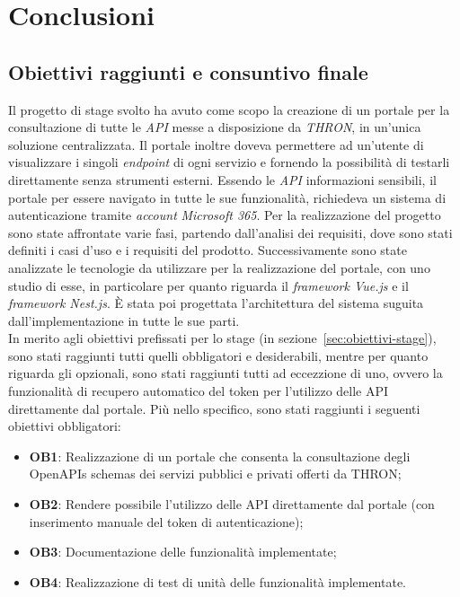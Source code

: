 \chapter{Conclusioni}\label{cap:conclusioni}


\section{Obiettivi raggiunti e consuntivo finale}
Il progetto di stage svolto ha avuto come scopo la creazione di un portale per la consultazione di tutte le \textit{API} messe a disposizione da \textit{THRON}, in un'unica soluzione centralizzata. 
Il portale inoltre doveva permettere ad un'utente di visualizzare i singoli \textit{endpoint} di ogni servizio e fornendo la possibilità di testarli direttamente senza strumenti esterni.
Essendo le \textit{API} informazioni sensibili, il portale per essere navigato in tutte le sue funzionalità, richiedeva un sistema di autenticazione tramite \textit{account} \textit{Microsoft 365}.
Per la realizzazione del progetto sono state affrontate varie fasi, partendo dall'analisi dei requisiti, dove sono stati definiti i casi d'uso e i requisiti del prodotto.
Successivamente sono state analizzate le tecnologie da utilizzare per la realizzazione del portale, con uno studio di esse, in particolare per quanto riguarda il \textit{framework Vue.js} e il \textit{framework Nest.js}.
È stata poi progettata l'architettura del sistema suguita dall'implementazione in tutte le sue parti.\\

In merito agli obiettivi prefissati per lo stage (in sezione~\ref{sec:obiettivi-stage}), sono stati raggiunti tutti quelli obbligatori e desiderabili, mentre per quanto riguarda gli opzionali, sono stati raggiunti tutti ad eccezzione di uno, ovvero la funzionalità di recupero automatico del token per l'utilizzo delle API direttamente dal portale.
Più nello specifico, sono stati raggiunti i seguenti obiettivi obbligatori:
\begin{itemize}
  \item \textbf{OB1}: Realizzazione di un portale che consenta la consultazione degli OpenAPIs schemas dei servizi pubblici e privati offerti da THRON;
  \item \textbf{OB2}: Rendere possibile l'utilizzo delle API direttamente dal portale (con inserimento manuale del token di autenticazione);
  \item \textbf{OB3}: Documentazione delle funzionalità implementate;
  \item \textbf{OB4}: Realizzazione di test di unità delle funzionalità implementate.
\end{itemize}

